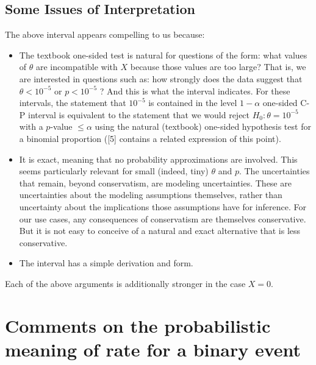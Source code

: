 \subsection{Some Issues of Interpretation}

The above interval appears compelling to us because:

\begin{itemize}
    \item The textbook one-sided test is natural for questions of the form: what values of $\theta$ are incompatible with $X$ because those values are too large? That is, we are interested in questions such as: how strongly does the data suggest that $\theta<10^{-5}$ or $p<10^{-5}$ ? And this is what the interval indicates. For these intervals, the statement that $10^{-5}$ is contained in the level $1-\alpha$ one-sided C-P interval is equivalent to the statement that we would reject $H_{0}: \theta=10^{-5}$ with a $p$-value $\leq \alpha$ using the natural (textbook) one-sided hypothesis test for a binomial proportion ([5] contains a related expression of this point).
    \item It is exact, meaning that no probability approximations are involved. This seems particularly relevant for small (indeed, tiny) $\theta$ and $p$. The uncertainties that remain, beyond conservatism, are modeling uncertainties. These are uncertainties about the modeling assumptions themselves, rather than uncertainty about the implications those assumptions have for inference. For our use cases, any consequences of conservatism are themselves conservative. But it is not easy to conceive of a natural and exact alternative that is less conservative.
    \item The interval has a simple derivation and form.
\end{itemize}

Each of the above arguments is additionally stronger in the case $X=0$.

\section{Comments on the probabilistic meaning of rate for a binary event}

